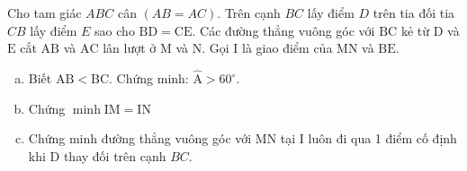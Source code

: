\begin{bt}
	Cho tam giác $A B C$ cân $(A B=A C)$. Trên cạnh $B C$ lấy điểm $D$ trên tia đối tia $C B$ lấy điểm $E$ sao cho $\mathrm{BD}=\mathrm{CE}$. Các đường thẳng vuông góc với $\mathrm{BC}$ kẻ từ $\mathrm{D}$ và $\mathrm{E}$ cắt $\mathrm{AB}$ và $\mathrm{AC}$ lân lượt ở $\mathrm{M}$ và N. Gọi I là giao điểm của $\mathrm{MN}$ và $\mathrm{BE}$.
	\begin{enumerate}[a.]
		\item Biết $\mathrm{AB}<\mathrm{BC}$. Chứng minh: $\hat{\mathrm{A}}>60^{\circ}$.
		\item Chứng $\operatorname{minh} \mathrm{IM}=\mathrm{IN}$
		\item Chứng minh đường thẳng vuông góc với $\mathrm{MN}$ tại I luôn đi qua 1 điểm cố định khi $\mathrm{D}$ thay đối trên cạnh $B C$.
	\end{enumerate}
\end{bt}